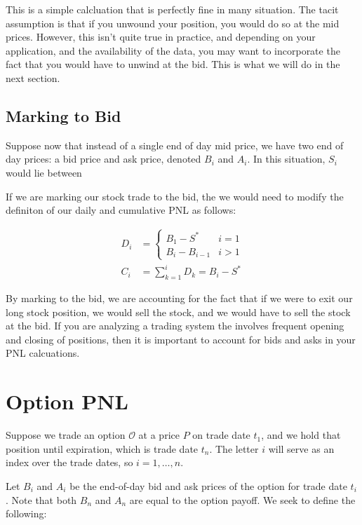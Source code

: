 \documentclass[11pt,]{krantz}
\begin{document}
This is a simple calcluation that is perfectly fine in many situation. The tacit assumption is that if you unwound your position, you would do so at the mid prices. However, this isn't quite true in practice, and depending on your application, and the availability of the data, you may want to incorporate the fact that you would have to unwind at the bid. This is what we will do in the next section.

\subsection{Marking to Bid}\label{marking-to-bid}

Suppose now that instead of a single end of day mid price, we have two end of day prices: a bid price and ask price, denoted \(B_{i}\) and \(A_{i}\). In this situation, \(S_{i}\) would lie between

If we are marking our stock trade to the bid, the we would need to modify the definiton of our daily and cumulative PNL as follows:

\begin{align*}
D_{i} &= \begin{cases} B_{1} - S^{*} & i = 1 \\ B_{i} - B_{i-1} & i > 1 \end{cases} \\[10pt]
C_{i} &= \sum_{k=1}^{i} D_{k} = B_{i} - S^{*}
\end{align*}

By marking to the bid, we are accounting for the fact that if we were to exit our long stock position, we would sell the stock, and we would have to sell the stock at the bid. If you are analyzing a trading system the involves frequent opening and closing of positions, then it is important to account for bids and asks in your PNL calcuations.

\section{Option PNL}\label{option-pnl}

Suppose we trade an option \(\mathcal{O}\) at a price \(P\) on trade date \(t_{1}\), and we hold that position until expiration, which is trade date \(t_{n}\). The letter \(i\) will serve as an index over the trade dates, so \(i = 1,\ldots,n\).

Let \(B_{i}\) and \(A_{i}\) be the end-of-day bid and ask prices of the option for trade date \(t_{i}\). Note that both \(B_{n}\) and \(A_{n}\) are equal to the option payoff. We seek to define the following:
\end{document}
